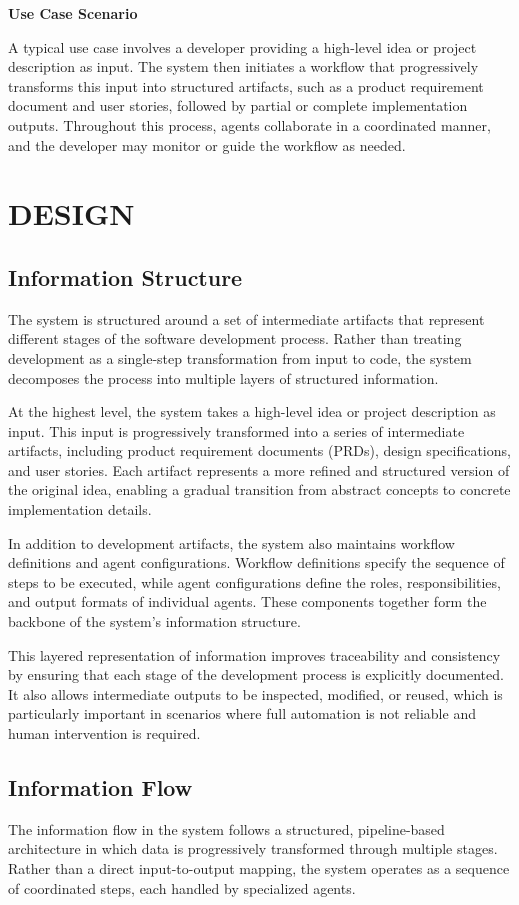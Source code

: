 \documentclass[a4paper,12pt]{report}
\begin{document}
\textbf{Use Case Scenario}

A typical use case involves a developer providing a high-level idea or project description as input. The system then initiates a workflow that progressively transforms this input into structured artifacts, such as a product requirement document and user stories, followed by partial or complete implementation outputs. Throughout this process, agents collaborate in a coordinated manner, and the developer may monitor or guide the workflow as needed.

\chapter{DESIGN}

\section{Information Structure}
The system is structured around a set of intermediate artifacts that represent different stages of the software development process. Rather than treating development as a single-step transformation from input to code, the system decomposes the process into multiple layers of structured information.

At the highest level, the system takes a high-level idea or project description as input. This input is progressively transformed into a series of intermediate artifacts, including product requirement documents (PRDs), design specifications, and user stories. Each artifact represents a more refined and structured version of the original idea, enabling a gradual transition from abstract concepts to concrete implementation details.

In addition to development artifacts, the system also maintains workflow definitions and agent configurations. Workflow definitions specify the sequence of steps to be executed, while agent configurations define the roles, responsibilities, and output formats of individual agents. These components together form the backbone of the system's information structure.

This layered representation of information improves traceability and consistency by ensuring that each stage of the development process is explicitly documented. It also allows intermediate outputs to be inspected, modified, or reused, which is particularly important in scenarios where full automation is not reliable and human intervention is required.

\section{Information Flow}
The information flow in the system follows a structured, pipeline-based architecture in which data is progressively transformed through multiple stages. Rather than a direct input-to-output mapping, the system operates as a sequence of coordinated steps, each handled by specialized agents.
\end{document}
